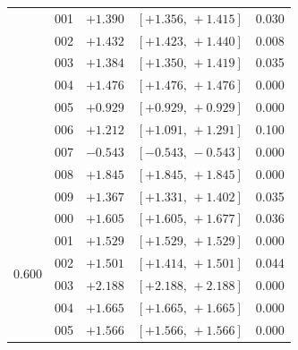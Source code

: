 \documentclass[11pt,a4paper]{article}
\begin{document}
\begin{table}[h]
\begin{tabular}{r l r@{\,}l r}
 & \textcolor{warnred}{001} & \textcolor{warnred}{$+1.390$} & \textcolor{warnred}{$[+1.356,\,+1.415]$} & \textcolor{warnred}{0.030} \\
 & \textcolor{warnred}{002} & \textcolor{warnred}{$+1.432$} & \textcolor{warnred}{$[+1.423,\,+1.440]$} & \textcolor{warnred}{0.008} \\
 & \textcolor{warnred}{003} & \textcolor{warnred}{$+1.384$} & \textcolor{warnred}{$[+1.350,\,+1.419]$} & \textcolor{warnred}{0.035} \\
 & \textcolor{warnred}{004} & \textcolor{warnred}{$+1.476$} & \textcolor{warnred}{$[+1.476,\,+1.476]$} & \textcolor{warnred}{0.000} \\
 & \textcolor{warnred}{005} & \textcolor{warnred}{$+0.929$} & \textcolor{warnred}{$[+0.929,\,+0.929]$} & \textcolor{warnred}{0.000} \\
 & \textcolor{warnred}{006} & \textcolor{warnred}{$+1.212$} & \textcolor{warnred}{$[+1.091,\,+1.291]$} & \textcolor{warnred}{0.100} \\
 & \textcolor{warnred}{007} & \textcolor{warnred}{$-0.543$} & \textcolor{warnred}{$[-0.543,\,-0.543]$} & \textcolor{warnred}{0.000} \\
 & \textcolor{warnred}{008} & \textcolor{warnred}{$+1.845$} & \textcolor{warnred}{$[+1.845,\,+1.845]$} & \textcolor{warnred}{0.000} \\
 & \textcolor{warnred}{009} & \textcolor{warnred}{$+1.367$} & \textcolor{warnred}{$[+1.331,\,+1.402]$} & \textcolor{warnred}{0.035} \\
\midrule
\multirow{10}{*}{0.600}
 & \textcolor{warnred}{000} & \textcolor{warnred}{$+1.605$} & \textcolor{warnred}{$[+1.605,\,+1.677]$} & \textcolor{warnred}{0.036} \\
 & \textcolor{warnred}{001} & \textcolor{warnred}{$+1.529$} & \textcolor{warnred}{$[+1.529,\,+1.529]$} & \textcolor{warnred}{0.000} \\
 & \textcolor{warnred}{002} & \textcolor{warnred}{$+1.501$} & \textcolor{warnred}{$[+1.414,\,+1.501]$} & \textcolor{warnred}{0.044} \\
 & \textcolor{warnred}{003} & \textcolor{warnred}{$+2.188$} & \textcolor{warnred}{$[+2.188,\,+2.188]$} & \textcolor{warnred}{0.000} \\
 & \textcolor{warnred}{004} & \textcolor{warnred}{$+1.665$} & \textcolor{warnred}{$[+1.665,\,+1.665]$} & \textcolor{warnred}{0.000} \\
 & \textcolor{warnred}{005} & \textcolor{warnred}{$+1.566$} & \textcolor{warnred}{$[+1.566,\,+1.566]$} & \textcolor{warnred}{0.000} \\

\end{tabular}
\end{table}
\end{document}
